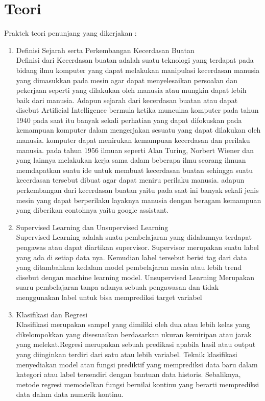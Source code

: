 \section{Teori}
Praktek teori penunjang yang dikerjakan :
\begin{enumerate}
\item
Definisi Sejarah serta Perkembangan Kecerdasan Buatan\\
Definisi dari Kecerdasan buatan adalah suatu teknologi yang terdapat pada bidang ilmu komputer yang dapat melakukan manipulasi kecerdasan manusia yang dimasukkan pada mesin agar dapat menyelesaikan persoalan dan pekerjaan seperti yang dilakukan oleh manusia atau mungkin dapat lebih baik dari manusia. Adapun sejarah dari kecerdasan buatan atau dapat disebut Artificial Intelligence bermula ketika munculna komputer pada tahun 1940 pada saat itu banyak sekali perhatian yang dapat difokuskan pada kemampuan komputer dalam mengerjakan sesuatu yang dapat dilakukan oleh manusia. komputer dapat menirukan kemampuan kecerdasan dan perilaku manusia. pada tahun 1956 ilmuan seperti Alan Turing, Norbert Wiener dan yang lainnya melakukan kerja sama dalam beberapa ilmu seorang ilmuan memdapatkan suatu ide untuk membuat kecerdasan buatan sehingga suatu kecerdasan tersebut dibuat agar dapat meniru perilaku manusia. adapun perkembangan dari kecerdasan buatan yaitu pada saat ini banyak sekali jenis mesin yang dapat berperilaku layaknya manusia dengan beragam kemampuan yang diberikan contohnya yaitu google assistant.
\item
Supervised Learning dan Unsupervised Learning\\
Supervised Learning adalah suatu pembelajaran yang didalamnya terdapat pengawas atau dapat diartikan supervisor. Supervisor merupakan suatu label yang ada di setiap data nya. Kemudian label tersebut berisi tag dari data yang ditambahkan kedalam model pembelajaran mesin atau lebih trend disebut dengan machine learning model. Unsupervised Learning Merupakan suaru pembelajaran tanpa adanya sebuah pengawasan dan tidak menggunakan label untuk bisa memprediksi target variabel\\
\item
Klasifikasi dan Regresi\\
Klasifikasi merupakan sampel yang dimiliki oleh dua atau lebih kelas yang dikelompokkan yang disesuaikan berdasarkan ukuran kemiripan atau jarak yang melekat.Regresi merupakan sebuah predikasi apabila hasil atau output yang diinginkan terdiri dari satu atau lebih variabel. Teknik klasifikasi menyediakan model atau fungsi prediktif yang memprediksi data baru dalam kategori atau label tersendiri dengan bantuan data historis. Sebaliknya, metode regresi memodelkan fungsi bernilai kontinu yang berarti memprediksi data dalam data numerik kontinu.\\

\end{enumerate}
